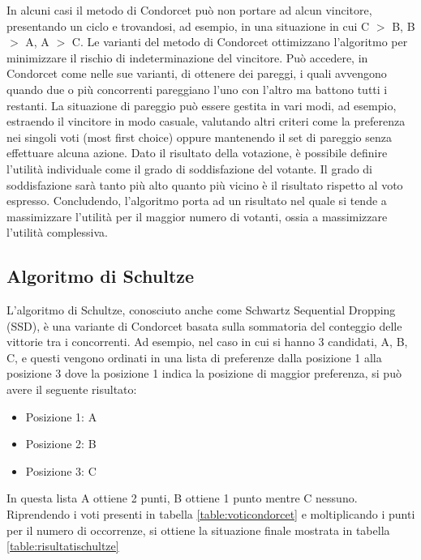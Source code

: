 \documentclass[12pt,a4paper,openright,twoside]{book}
\begin{document}
In alcuni casi il metodo di Condorcet può non portare ad alcun vincitore, presentando un ciclo e trovandosi, ad esempio, in una situazione 
in cui C $>$ B, B $>$ A, A $>$ C.
Le varianti del metodo di Condorcet ottimizzano l'algoritmo per minimizzare il rischio
di indeterminazione del vincitore.
Può accedere, in Condorcet come nelle sue varianti, di ottenere dei pareggi,
i quali avvengono quando due o più concorrenti pareggiano l'uno con l'altro ma 
battono tutti i restanti. La situazione di pareggio può essere gestita in vari
modi, ad esempio, estraendo il vincitore in modo casuale, valutando altri criteri
come la preferenza nei singoli voti (most first choice) oppure mantenendo il set di pareggio
senza effettuare alcuna azione.
Dato il risultato della votazione, è possibile definire l'utilità individuale come il grado
di soddisfazione del votante. Il grado di soddisfazione sarà tanto più alto 
quanto più vicino è il risultato rispetto al voto espresso.
Concludendo, l'algoritmo porta ad un risultato nel quale si tende a massimizzare
l'utilità per il maggior numero di votanti, ossia a massimizzare l'utilità
complessiva. 

\subsection{Algoritmo di Schultze}
L'algoritmo di Schultze, conosciuto anche come Schwartz Sequential Dropping (SSD),
è una variante di Condorcet basata sulla sommatoria del conteggio delle vittorie tra i concorrenti.
Ad esempio, nel caso in cui si hanno 3 candidati, A, B, C,
e questi vengono ordinati in una lista di preferenze dalla posizione 1 alla posizione 3 dove la posizione 1 
indica la posizione di maggior preferenza, si può avere il seguente risultato:
\begin{itemize}
    \item{Posizione 1: A}
    \item{Posizione 2: B}
    \item{Posizione 3: C}
\end{itemize}    
In questa lista A ottiene 2 punti, B ottiene 1 punto mentre C nessuno.
Riprendendo i voti presenti in tabella \ref{table:voticondorcet} e moltiplicando
i punti per il numero di occorrenze, si ottiene la situazione finale mostrata in tabella \ref{table:risultatischultze}
\end{document}
